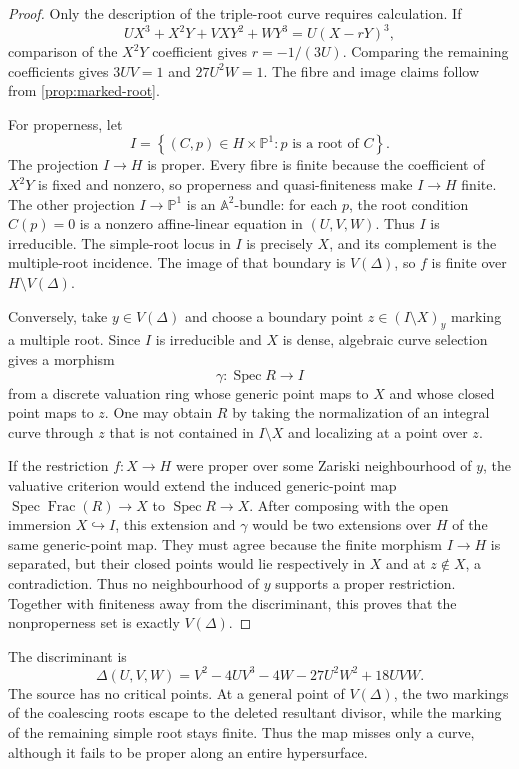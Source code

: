 \documentclass[11pt,reqno]{amsart}
\theoremstyle{definition}
\theoremstyle{remark}
\newcommand{\A}{\mathbb A}
\newcommand{\Pj}{\mathbb P}
\newcommand{\Spec}{\operatorname{Spec}}
\newcommand{\set}[1]{\left\{#1\right\}}
\begin{document}
\begin{proof}
Only the description of the triple-root curve requires calculation.  If
\[
 UX^3+X^2Y+VXY^2+WY^3=U(X-rY)^3,
\]
comparison of the $X^2Y$ coefficient gives $r=-1/(3U)$.  Comparing the
remaining coefficients gives $3UV=1$ and $27U^2W=1$.  The fibre and image
claims follow from \cref{prop:marked-root}.

For properness, let
\[
 I=\set{(C,p)\in H\times\Pj^1:p\text{ is a root of }C}.
\]
The projection $I\to H$ is proper.  Every fibre is finite because the
coefficient of $X^2Y$ is fixed and nonzero, so properness and
quasi-finiteness make $I\to H$ finite.  The other projection
$I\to\Pj^1$ is an $\A^2$-bundle: for each $p$, the root condition
$C(p)=0$ is a nonzero affine-linear equation in $(U,V,W)$.  Thus $I$ is
irreducible.  The simple-root locus in $I$ is precisely $X$, and its
complement is the multiple-root incidence.  The image of that boundary
is $V(\Delta)$, so $f$ is finite over $H\setminus V(\Delta)$.

Conversely, take $y\in V(\Delta)$ and choose a boundary point
$z\in(I\setminus X)_y$ marking a multiple root.  Since $I$ is
irreducible and $X$ is dense, algebraic curve selection gives a morphism
\[
 \gamma:\Spec R\longrightarrow I
\]
from a discrete valuation ring whose generic point maps to $X$ and whose
closed point maps to $z$.  One may obtain $R$ by taking the normalization
of an integral curve through $z$ that is not contained in $I\setminus X$
and localizing at a point over $z$.

If the restriction $f:X\to H$ were proper over some Zariski
neighbourhood of $y$, the valuative criterion would extend the induced
generic-point map $\Spec\operatorname{Frac}(R)\to X$ to
$\Spec R\to X$.  After composing with the open immersion $X\hookrightarrow
I$, this extension and $\gamma$ would be two extensions over $H$ of the
same generic-point map.  They must agree because the finite morphism
$I\to H$ is separated, but their closed points would lie respectively in
$X$ and at $z\notin X$, a contradiction.  Thus no neighbourhood of $y$
supports a proper restriction.  Together with finiteness away from the
discriminant, this proves that the nonproperness set is exactly
$V(\Delta)$.
\end{proof}

The discriminant is
\begin{equation}\label{eq:discriminant}
 \Delta(U,V,W)=V^2-4UV^3-4W-27U^2W^2+18UVW.
\end{equation}
The source has no critical points.  At a general point of $V(\Delta)$,
the two markings of the coalescing roots escape to the deleted resultant
divisor, while the marking of the remaining simple root stays finite.
Thus the map misses only a curve, although it fails to be proper along an
entire hypersurface.
\end{document}
